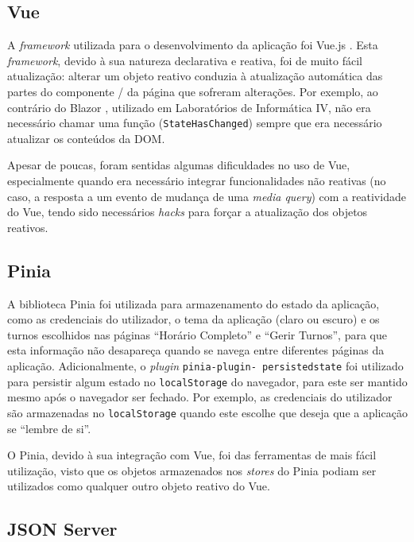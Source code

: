 \documentclass[12pt, a4paper]{article}
\begin{document}
\subsection{Vue}

A \emph{framework} utilizada para o desenvolvimento da aplicação foi Vue.js \cite{vue}. Esta
\emph{framework}, devido à sua natureza declarativa e reativa, foi de muito fácil atualização:
alterar um objeto reativo conduzia à atualização automática das partes do componente / da página que
sofreram alterações. Por exemplo, ao contrário do Blazor \cite{blazor}, utilizado em Laboratórios de
Informática IV, não era necessário chamar uma função (\texttt{StateHasChanged}) sempre que era
necessário atualizar os conteúdos da DOM.

Apesar de poucas, foram sentidas algumas dificuldades no uso de Vue, especialmente quando era
necessário integrar funcionalidades não reativas (no caso, a resposta a um evento de mudança de uma
\emph{media query}) com a reatividade do Vue, tendo sido necessários \emph{hacks} para forçar a
atualização dos objetos reativos.

\subsection{Pinia}

A biblioteca Pinia \cite{pinia} foi utilizada para armazenamento do estado da aplicação, como as
credenciais do utilizador, o tema da aplicação (claro ou escuro) e os turnos escolhidos nas páginas
``Horário Completo'' e ``Gerir Turnos'', para que esta informação não desapareça quando se navega
entre diferentes páginas da aplicação. Adicionalmente, o \emph{plugin}
\texttt{pinia-plugin- persistedstate} \cite{pinia-persistent} foi utilizado para persistir algum
estado no \texttt{localStorage} do navegador, para este ser mantido mesmo após o navegador ser
fechado. Por exemplo, as credenciais do utilizador são armazenadas no \texttt{localStorage} quando
este escolhe que deseja que a aplicação se ``lembre de si''.

O Pinia, devido à sua integração com Vue, foi das ferramentas de mais fácil utilização, visto que os
objetos armazenados nos \emph{stores} do Pinia podiam ser utilizados como qualquer outro objeto
reativo do Vue.

\subsection{JSON Server}
\end{document}
